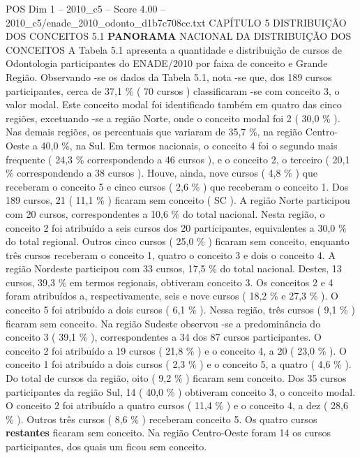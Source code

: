 \begin{textsample}{POS Dim 1 – 2010\_c5 – Score 4.00 – 2010\_c5/enade\_2010\_odonto\_d1b7c708cc.txt}  \label{ex:f1_pos_135}
CAPÍTULO 5 DISTRIBUIÇÃO DOS CONCEITOS 5.1 \textbf{PANORAMA} NACIONAL DA DISTRIBUIÇÃO DOS CONCEITOS A Tabela 5.1 apresenta a quantidade e distribuição de cursos de Odontologia participantes do ENADE/2010 por faixa de conceito e Grande Região.
Observando -se os dados da Tabela 5.1, nota -se que, dos 189 cursos participantes, cerca de 37,1 \% ( 70 cursos ) classificaram -se com conceito 3, o valor modal.
Este conceito modal foi identificado também em quatro das cinco regiões, excetuando -se a região Norte, onde o conceito modal foi 2 ( 30,0 \% ).
Nas demais regiões, os percentuais que variaram de 35,7 \%, na região Centro-Oeste a 40,0 \%, na Sul.
Em termos nacionais, o conceito 4 foi o segundo mais frequente ( 24,3 \% correspondendo a 46 cursos ), e o conceito 2, o terceiro ( 20,1 \% correspondendo a 38 cursos ).
Houve, ainda, nove cursos ( 4,8 \% ) que receberam o conceito 5 e cinco cursos ( 2,6 \% ) que receberam o conceito 1.
Dos 189 cursos, 21 ( 11,1 \% ) ficaram sem conceito ( SC ).
A região Norte participou com 20 cursos, correspondentes a 10,6 \% do total nacional.
Nesta região, o conceito 2 foi atribuído a seis cursos dos 20 participantes, equivalentes a 30,0 \% do total regional.
Outros cinco cursos ( 25,0 \% ) ficaram sem conceito, enquanto três cursos receberam o conceito 1, quatro o conceito 3 e dois o conceito 4.
A região Nordeste participou com 33 cursos, 17,5 \% do total nacional.
Destes, 13 cursos, 39,3 \% em termos regionais, obtiveram conceito 3.
Os conceitos 2 e 4 foram atribuídos a, respectivamente, seis e nove cursos ( 18,2 \% e 27,3 \% ).
O conceito 5 foi atribuído a dois cursos ( 6,1 \% ).
Nessa região, três cursos ( 9,1 \% ) ficaram sem conceito.
Na região Sudeste observou -se a predominância do conceito 3 ( 39,1 \% ), correspondentes a 34 dos 87 cursos participantes.
O conceito 2 foi atribuído a 19 cursos ( 21,8 \% ) e o conceito 4, a 20 ( 23,0 \% ).
O conceito 1 foi atribuído a dois cursos ( 2,3 \% ) e o conceito 5, a quatro ( 4,6 \% ).
Do total de cursos da região, oito ( 9,2 \% ) ficaram sem conceito.
Dos 35 cursos participantes da região Sul, 14 ( 40,0 \% ) obtiveram conceito 3, o conceito modal.
O conceito 2 foi atribuído a quatro cursos ( 11,4 \% ) e o conceito 4, a dez ( 28,6 \% ).
Outros três cursos ( 8,6 \% ) receberam conceito 5.
Os quatro cursos \textbf{restantes} ficaram sem conceito.
Na região Centro-Oeste foram 14 os cursos participantes, dos quais um ficou sem conceito.

\end{textsample}
